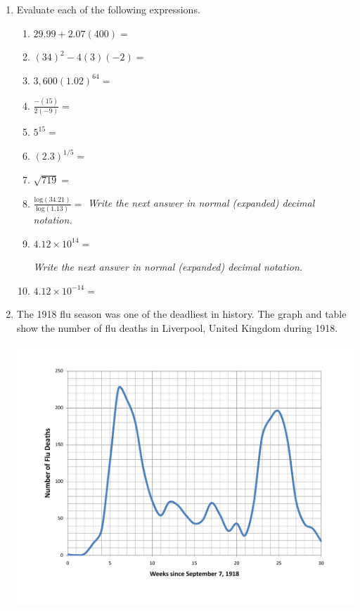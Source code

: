 \documentclass[12pt]{article}
\begin{document}
  \vspace{.2in}
 
 \hrulefill
 
\newpage  %

\begin{enumerate}
\item Evaluate each of the following expressions.

\begin{enumerate}
\item $29.99 + 2.07(400)=$
\vfill
\item $(34)^2-4(3)(-2)=$
\vfill
\item $3,600(1.02)^{64}=$
\vfill
\item $\displaystyle \frac{-(15)}{2(-9)}=$
\vfill
\item $5^{15}=$
\vfill
\item $(2.3)^{1/5}=$
\vfill
\item $\sqrt{719}=$
\vfill
\item $\displaystyle \frac{\text{log}(34.21)}{\text{log}(1.13)}=$
\vfill
\emph{Write the next answer in normal (expanded) decimal notation.}
\item $4.12 \times 10^{14}=$  


\vfill
\emph{Write the next answer in normal (expanded) decimal notation.}
\item $4.12 \times 10^{-14}=$  


\vfill
\end{enumerate}

\newpage  %

\item The 1918 flu season was one of the deadliest in history.  The graph and table show the number of flu deaths in Liverpool, United Kingdom during 1918.

\begin{center}
\includegraphics [width = .8\textwidth] {LiverpoolFlu.pdf}
\end{center}


\end{enumerate}
\end{document}
